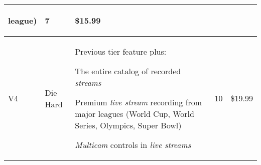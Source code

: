 \begin{center}
\begin{tabular}{|p{}|p{}|p{}|p{}|p{}|}
\begin{packed_enum}
{		league)
	}
\end{packed_enum} & 7 & \$15.99 \\ 
\hline
V4 & Die Hard & Previous tier feature plus: \begin{packed_enum}
	\small{
		\item The entire catalog of recorded \textit{streams}
		\item Premium \textit{live stream} recording from 
		major leagues (World Cup, World Series, Olympics, Super Bowl)
		\item \textit{Multicam} controls in \textit{live streams}
	}
\end{packed_enum} & 10 & \$19.99 \\ 
\hline
\end{tabular}
\end{center}